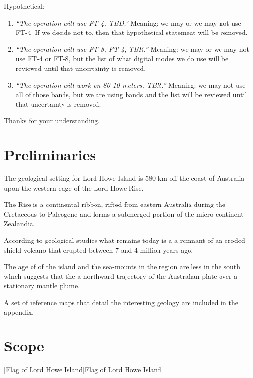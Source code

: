 \documentclass[11pt]{article}
\begin{document}
Hypothetical:
\par
\begin{enumerate}
\item {\textit{``The operation will use FT-4, TBD.''}}   Meaning: we may or we 
may not use FT-4.  If we decide not to, then that hypothetical statement will 
be removed.
\item {\textit{``The operation will use FT-8, FT-4, TBR.''}}   Meaning: we may 
or we may not use FT-4 or FT-8, but the list of what digital modes we do use
will be reviewed until that uncertainty is removed.
\item {\textit{``The operation will work on 80-10 meters, TBR.''}}  Meaning: 
we may not use all of those bands, but we are using bands and the list will be 
reviewed until that uncertainty is removed.
\end{enumerate}
\par
Thanks for your understanding.

\newpage
\section{Preliminaries}

The geological setting for Lord Howe Island is 580 km off the coast
of Australia upon the western edge of the Lord Howe Rise.

\par
The Rise is a continental ribbon, rifted from eastern 
Australia during the Cretaceous to Paleogene and
forms a submerged portion of the micro-continent
Zealandia.\cite{lhi}
\par
According to geological studies what remains today is a 
a remnant of an eroded shield volcano that 
erupted between 7 and 4 million years ago. 
\par
The age of of the island and the sea-mounts in the region are less in the
south which suggests that the a northward trajectory of the Australian plate
over a stationary mantle plume.
\par

A set of reference maps that detail the interesting geology are included
in the appendix.


\section{Scope}

\vskip2mm
\noindent%
\begin{minipage}{\linewidth}%
\captionsetup{width=0.8\linewidth}
[Flag of Lord Howe Island]{Flag of Lord Howe Island}
\label{flag}
\end{minipage}
\vskip5mm
\end{document}

